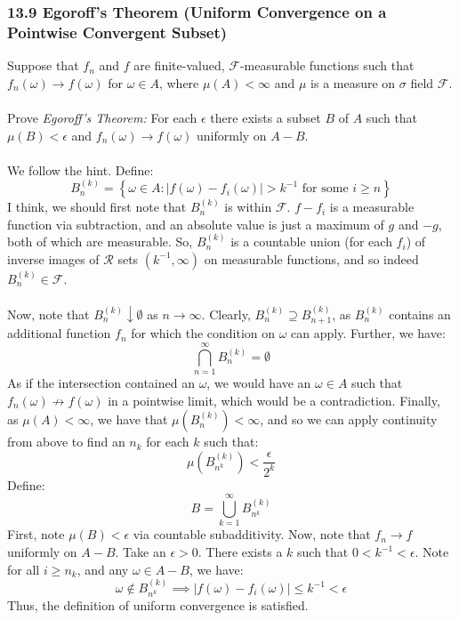 \documentclass[12pt,a4paper]{article}
\newcommand{\1}[1]{\mathbbm{1}\left\{ #1 \right\}}
\newcommand{\fcal}{\mathcal{F}}
\newcommand{\rcal}{\mathcal{R}}
\begin{document}
\subsubsection{13.9 Egoroff's Theorem (Uniform Convergence on a Pointwise Convergent Subset)} Suppose that $f_n$ and $f$ are finite-valued, $\fcal$-measurable functions such that $f_n(\omega) \to f(\omega)$ for $\omega \in A$, where $\mu(A) < \infty$ and $\mu$ is a measure on $\sigma$ field $\fcal$.
\\\\
Prove \textit{Egoroff's Theorem:} For each $\epsilon$ there exists a subset $B$ of $A$ such that $\mu(B) < \epsilon$ and $f_n(\omega) \to f(\omega)$ uniformly on $A - B$.
\\\\
We follow the hint. Define:
$$
	B_n^{(k)} = \left\{\omega \in A : |f(\omega) - f_i(\omega)| > k^{-1} \text{ for some $i \geq n$}\right\}
$$
I think, we should first note that $B_n^{(k)}$ is within $\fcal$. $f - f_i$ is a measurable function via subtraction, and an absolute value is just a maximum of $g$ and $-g$, both of which are measurable. So, $B_n^{(k)}$ is a countable union (for each $f_i$) of inverse images of $\rcal$ sets $(k^{-1},\infty)$ on measurable functions, and so indeed $B_n^{(k)} \in \fcal$.
\\\\
Now, note that $B_n^{(k)} \downarrow \emptyset$ as $n \to \infty$. Clearly, $B_n^{(k)} \supseteq B_{n+1}^{(k)}$, as $B_n^{(k)}$ contains an additional function $f_n$ for which the condition on $\omega$ can apply. Further, we have:
$$
	\bigcap_{n=1}^\infty B_n^{(k)} = \emptyset
$$
As if the intersection contained an $\omega$, we would have an $\omega \in A$ such that $f_n(\omega) \not\to f(\omega)$ in a pointwise limit, which would be a contradiction. Finally, as $\mu(A) < \infty$, we have that $\mu(B_n^{(k)}) < \infty$, and so we can apply continuity from above to find an $n_k$ for each $k$ such that:
$$
	\mu(B_{n^k}^{(k)}) < \frac{\epsilon}{2^k}
$$
Define:
$$
	B = \bigcup_{k=1}^\infty B_{n^k}^{(k)}
$$
First, note $\mu(B) < \epsilon$ via countable subadditivity. Now, note that $f_n \to f$ uniformly on $A - B$. Take an $\epsilon > 0$. There exists a $k$ such that $0 < k^{-1} < \epsilon$. Note for all $i \geq n_k$, and any $\omega \in A - B$, we have:
$$
	\omega \not\in B_{n^k}^{(k)} \implies |f(\omega) - f_i(\omega)| \leq k^{-1} < \epsilon
$$
Thus, the definition of uniform convergence is satisfied.
\end{document}
